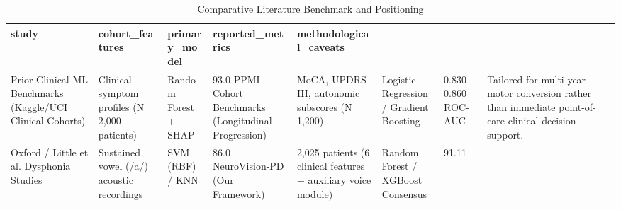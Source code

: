 \begin{table}
\caption{Comparative Literature Benchmark and Positioning}
\label{tab:literature}
\begin{tabular}{lllll}
\toprule
study & cohort_features & primary_model & reported_metrics & methodological_caveats \\
\midrule
Prior Clinical ML Benchmarks (Kaggle/UCI Clinical Cohorts) & Clinical symptom profiles (N ~ 2,000 patients) & Random Forest + SHAP & 93.0%
PPMI Cohort Benchmarks (Longitudinal Progression) & MoCA, UPDRS III, autonomic subscores (N ~ 1,200) & Logistic Regression / Gradient Boosting & 0.830 - 0.860 ROC-AUC & Tailored for multi-year motor conversion rather than immediate point-of-care clinical decision support. \\
Oxford / Little et al. Dysphonia Studies & Sustained vowel (/a/) acoustic recordings & SVM (RBF) / KNN & 86.0%
NeuroVision-PD (Our Framework) & 2,025 patients (6 clinical features + auxiliary voice module) & Random Forest / XGBoost Consensus & 91.11%
\bottomrule
\end{tabular}
\end{table}
